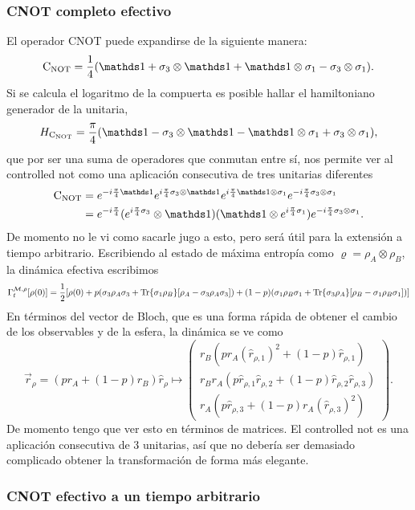 \subsubsection{CNOT completo efectivo}
El operador \textsc{CNOT} puede expandirse de la siguiente manera:
\begin{equation*}
        \cnot=\frac{1}{4}(\Id+\pauli{3}\otimes\Id+\Id\otimes\pauli{1}-\pauli{3}\otimes\pauli{1}).
\end{equation*}
Si se calcula el logaritmo de la compuerta es posible hallar el hamiltoniano generador de la unitaria,
\begin{equation*}
    H_{\cnot}=\frac{\pi}{4}\qty(\Id-\pauli{3}\otimes\Id-\Id\otimes\pauli{1}+\pauli{3}\otimes\pauli{1}),
\end{equation*}
que por ser una suma de operadores que conmutan entre sí, nos permite ver al controlled not como una aplicación consecutiva de tres unitarias diferentes
\begin{align*}
    \cnot&=e^{-i\frac{\pi}{4}\Id}e^{i\frac{\pi}{4}\pauli{3}\otimes\Id}e^{i\frac{\pi}{4}\Id\otimes\pauli{1}}e^{-i\frac{\pi}{4}\pauli{3}\otimes\pauli{1}}\\
    &=e^{-i\frac{\pi}{4}} (e^{i\frac{\pi}{4}\pauli{3}}\otimes \Id) (\Id \otimes e^{i\frac{\pi}{4}\pauli{1}}) e^{-i\frac{\pi}{4}\pauli{3}\otimes\pauli{1}}.
\end{align*}
De momento no le vi como sacarle jugo a esto, pero será útil para la extensión a tiempo arbitrario.
Escribiendo al estado de máxima entropía como $\varrho=\rho_{A}\otimes\rho_{B}$, la dinámica efectiva escribimos
\begin{equation*}
    \Gamma_{t}^{\mathcal{M},\rho}[\rho(0)]=\frac{1}{2}[\rho(0)+p(\sigma_{3}\rho_{A}\sigma_{3}+\Tr{\sigma_{1}\rho_{B}}[\rho_{A}-\sigma_{3}\rho_{A}\sigma_{3}])+(1-p)(\sigma_{1}\rho_{B}\sigma_{1}+\Tr{\sigma_{3}\rho_{A}}[\rho_{B}-\sigma_{1}\rho_{B}\sigma_{1}])]
\end{equation*}
En términos del vector de Bloch, que es una forma rápida de obtener el cambio de los observables y de la esfera, la dinámica se ve como
\begin{equation*}
    \vec{r}_{\rho}=(pr_{A}+(1-p)r_{B})\hat{r}_{\rho}\mapsto\begin{pmatrix}
        r_{B}(pr_{A}(\hat{r}_{\rho,1})^2+(1-p)\hat{r}_{\rho,1})\\
        r_{B}r_{A}(p\hat{r}_{\rho,1}\hat{r}_{\rho,2}+(1-p)\hat{r}_{\rho,2}\hat{r}_{\rho,3})\\
        r_{A}(p\hat{r}_{\rho,3}+(1-p)r_{A}(\hat{r}_{\rho,3})^{2})
    \end{pmatrix}.
  \end{equation*}
  De momento tengo que ver esto en términos de matrices. El controlled not es una aplicación consecutiva de 3 unitarias, así que no debería ser demasiado complicado obtener la transformación de forma más elegante.

\subsubsection{CNOT efectivo a un tiempo arbitrario}